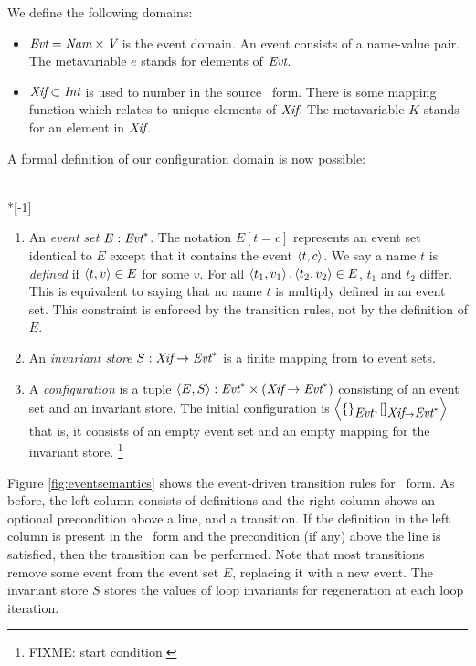 \documentclass[12pt,notitlepage]{article}
\begin{document}
We define the following domains:
\begin{itemize}
\item ${\mbox{\em Evt}} = {\mbox{\em Nam}} \times {\mbox{\em V}}$ is the event
domain.  An event consists of a name-value pair.  The metavariable $e$
stands for elements of ${\mbox{\em Evt}}$.
\item ${\mbox{\em Xif}} \subset {\mbox{\em Int}}$ is used to number
 in the source \ssiplus\ form.  There is some mapping
function which relates  to unique elements of
${\mbox{\em Xif}}$.  The metavariable $K$ stands for an element in
${\mbox{\em Xif}}$.
\end{itemize}

A formal definition of our configuration domain is now possible:
\begin{definition}~\\*[-1\baselineskip]
\begin{enumerate}
\item An \emph{event set} $E:{\mbox{\em Evt}}^*$.
The notation $E[t=c]$ represents an event set
identical to $E$ except that it contains the event $\left\langle t,c \right\rangle$.  We
say a name $t$ is \emph{defined} if $\left\langle t,v \right\rangle \in E$ for some $v$.
For all $\left\langle t_1,v_1 \right\rangle,\left\langle t_2,v_2 \right\rangle \in E$, $t_1$ and $t_2$
differ.  This is equivalent to saying that no name $t$ is multiply
defined in an event set.  This constraint is enforced by the
transition rules, not by the definition of $E$.
\item An \emph{invariant store} $S: {\mbox{\em Xif}} \to
{\mbox{\em Evt}}^*$ is a finite mapping from  to event sets.
\item A \emph{configuration} is a tuple
$\left\langle E, S \right\rangle:{\mbox{\em Evt}}^* \times ({\mbox{\em Xif}}\to{\mbox{\em Evt}}^*)$ consisting
of an event set and an invariant store.  The initial
configuration is
$\left\langle \{\}_{{\mbox{\em Evt}}},
        []_{{\mbox{\em Xif}} \to {\mbox{\em Evt}}^*} \right\rangle$
that is, it consists of an empty event set and
an empty mapping for the invariant store.%
\footnote{FIXME: start condition.}
\end{enumerate}
\end{definition}

Figure \ref{fig:eventsemantics} shows the event-driven transition
rules for \ssiplus\ form.  As before, the left column consists of
definitions and the right column shows an optional precondition above
a line, and a transition.  If the definition in the left column is
present in the \ssiplus\ form and the precondition (if any) above the
line is satisfied, then the transition can be performed.  Note that
most transitions remove some event from the event set $E$, replacing
it with a new event.  The invariant store $S$ stores
the values of loop invariants for regeneration at each loop iteration.
\end{document}
